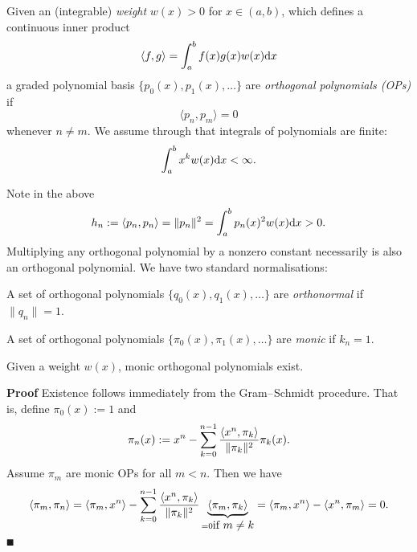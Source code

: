 \begin{definition} Given an (integrable) \emph{weight} $w(x) > 0$ for $x \ensuremath{\in} (a,b)$, which defines a continuous inner product
\[
\ensuremath{\langle}f,g\ensuremath{\rangle} = \ensuremath{\int}_a^b  f(x) g(x) w(x) {\rm d} x
\]
a graded polynomial basis $\{p_0(x), p_1(x), \ensuremath{\ldots} \}$ are \emph{orthogonal polynomials (OPs)} if
\[
\ensuremath{\langle}p_n,p_m\ensuremath{\rangle} = 0
\]
whenever $n \ensuremath{\neq} m$. We assume through that integrals of polynomials are finite:
\[
\ensuremath{\int}_a^b  x^k w(x) {\rm d} x < \ensuremath{\infty}.
\]
\end{definition}

Note in the above
\[
h_n := \ensuremath{\langle}p_n,p_n\ensuremath{\rangle} = \|p_n\|^2 = \ensuremath{\int}_a^b  p_n(x)^2 w(x) {\rm d} x > 0.
\]
Multiplying any orthogonal polynomial by a nonzero constant necessarily is also an orthogonal polynomial. We have two standard normalisations:

\begin{definition} A set of orthogonal polynomials $\{q_0(x), q_1(x), \ensuremath{\ldots} \}$ are \emph{orthonormal} if $\|q_n\| = 1$. \end{definition}

\begin{definition} A set of orthogonal polynomials $\{\ensuremath{\pi}_0(x), \ensuremath{\pi}_1(x), \ensuremath{\ldots} \}$ are \emph{monic} if $k_n = 1$. \end{definition}

\begin{proposition}[existence] Given a weight $w(x)$, monic orthogonal polynomials exist.

\end{proposition}
\textbf{Proof} Existence follows immediately from the Gram\ensuremath{\endash}Schmidt procedure. That is, define $\ensuremath{\pi}_0(x) := 1$ and
\[
\ensuremath{\pi}_n(x) := x^n - \ensuremath{\sum}_{k=0}^{n-1} {\ensuremath{\langle}x^n,\ensuremath{\pi}_k\ensuremath{\rangle} \over \|\ensuremath{\pi}_k\|^2} \ensuremath{\pi}_k(x).
\]
Assume $\ensuremath{\pi}_m$ are monic OPs for all $m < n$. Then we have
\[
\ensuremath{\langle}\ensuremath{\pi}_m, \ensuremath{\pi}_n\ensuremath{\rangle} = \ensuremath{\langle}\ensuremath{\pi}_m, x^n \ensuremath{\rangle} - \ensuremath{\sum}_{k=0}^{n-1} {\ensuremath{\langle}x^n,\ensuremath{\pi}_k\ensuremath{\rangle} \over \|\ensuremath{\pi}_k\|^2} \underbrace{\ensuremath{\langle}\ensuremath{\pi}_m, \ensuremath{\pi}_k\ensuremath{\rangle}}_{= 0 \hbox{if $m \ensuremath{\neq} k$}}  = \ensuremath{\langle}\ensuremath{\pi}_m, x^n \ensuremath{\rangle} - \ensuremath{\langle}x^n,\ensuremath{\pi}_m\ensuremath{\rangle} = 0.
\]
\ensuremath{\QED}

